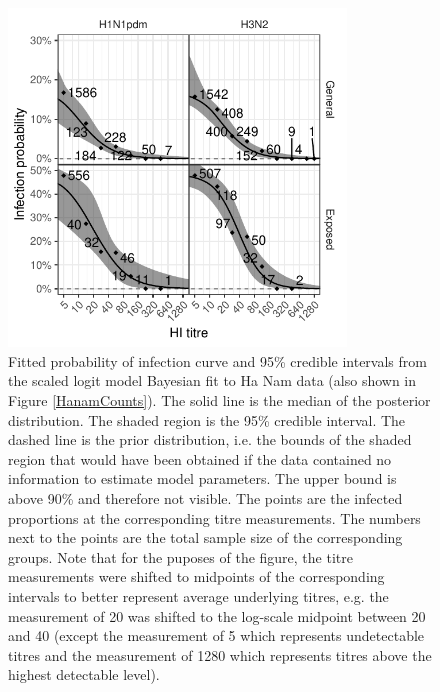 \documentclass[12pt]{article}
\begin{document}
\begin{figure}[htp]
	\centering
	\includegraphics[width=0.8\textwidth]{../fit-sclr-bayesian-plot/hanam-hi-inf.pdf}
	\caption{
	Fitted probability of infection curve and 95\% credible intervals from the scaled logit model Bayesian fit to Ha Nam data (also shown in Figure \ref{HanamCounts}). The solid line is the median of the posterior distribution. The shaded region is the 95\% credible interval. The dashed line is the prior distribution, i.e. the bounds of the shaded region that would have been obtained if the data contained no information to estimate model parameters. The upper bound is above 90\% and therefore not visible. The points are the infected proportions at the corresponding titre measurements. The numbers next to the points are the total sample size of the corresponding groups. Note that for the puposes of the figure, the titre measurements were shifted to midpoints of the corresponding intervals to better represent average underlying titres, e.g. the measurement of 20 was shifted to the log-scale midpoint between 20 and 40 (except the measurement of 5 which represents undetectable titres and the measurement of 1280 which represents titres above the highest detectable level).
	}
	\label{SclrBayesInf}
\end{figure}

\pagebreak
\end{document}
